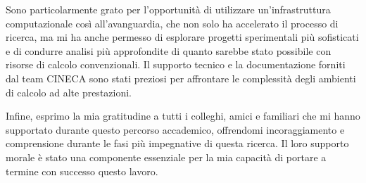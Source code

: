 \documentclass[12pt,a4paper]{article}
\begin{document}
Sono particolarmente grato per l'opportunità di utilizzare un'infrastruttura computazionale così all'avanguardia, che non solo ha accelerato il processo di ricerca, ma mi ha anche permesso di esplorare progetti sperimentali più sofisticati e di condurre analisi più approfondite di quanto sarebbe stato possibile con risorse di calcolo convenzionali. Il supporto tecnico e la documentazione forniti dal team CINECA sono stati preziosi per affrontare le complessità degli ambienti di calcolo ad alte prestazioni.

Infine, esprimo la mia gratitudine a tutti i colleghi, amici e familiari che mi hanno supportato durante questo percorso accademico, offrendomi incoraggiamento e comprensione durante le fasi più impegnative di questa ricerca. Il loro supporto morale è stato una componente essenziale per la mia capacità di portare a termine con successo questo lavoro.



\end{document}
